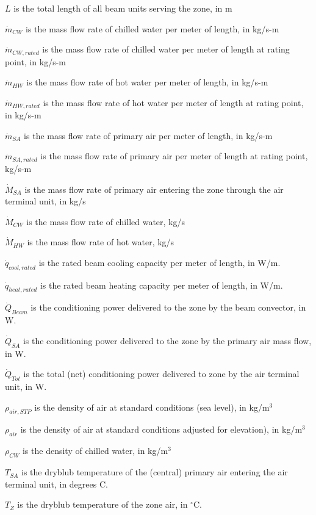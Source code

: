 \({L}\) is the total length of all beam units serving the zone, in m

\({\dot m_{CW}}\) is the mass flow rate of chilled water per meter of length, in kg/s-m

\({\dot m_{CW,rated}}\) is the mass flow rate of chilled water per meter of length at rating point, in kg/s-m

\({\dot m_{HW}}\) is the mass flow rate of hot water per meter of length, in kg/s-m

\({\dot m_{HW,rated}}\) is the mass flow rate of hot water per meter of length at rating point, in kg/s-m

\({\dot m_{SA}}\) is the mass flow rate of primary air per meter of length, in kg/s-m

\({\dot m_{SA,rated}}\) is the mass flow rate of primary air per meter of length at rating point, kg/s-m

\({\dot M_{SA}}\) is the mass flow rate of primary air entering the zone through the air terminal unit, in kg/s

\({\dot M_{CW}}\) is the mass flow rate of chilled water, kg/s

\({\dot M_{HW}}\) is the mass flow rate of hot water, kg/s

\({\dot q_{cool,rated}}\) is the rated beam cooling capacity per meter of length, in W/m.

\({\dot q_{heat,rated}}\) is the rated beam heating capacity per meter of length, in W/m.

\({\dot Q_{Beam}}\) is the conditioning power delivered to the zone by the beam convector, in W.

\({\dot Q_{SA}}\) is the conditioning power delivered to the zone by the primary air mass flow, in W.

\({\dot Q_{Tot}}\) is the total (net) conditioning power delivered to zone by the air terminal unit, in W.

\({\rho_{air,STP}}\) is the density of air at standard conditions (sea level), in kg/m\(^{3}\)

\({\rho_{air}}\) is the density of air at standard conditions adjusted for elevation), in kg/m\(^{3}\)

\({\rho_{CW}}\) is the density of chilled water, in kg/m\(^{3}\)

\({T_{SA}}\) is the dryblub temperature of the (central) primary air entering the air terminal unit, in degrees C.

\({T_{Z}}\) is the dryblub temperature of the zone air, in  \(^{\circ}\)C.

